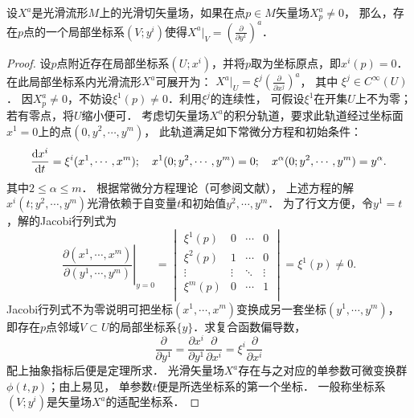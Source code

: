 \begin{theorem}\label{chdm:thm_1PDG-ppy}
    设$X^a$是光滑流形$M$上的光滑切矢量场，如果在点$p \in M$矢量场$X^a_p \neq 0$，
    那么，存在$p$点的一个局部坐标系$(V;y^i)$使得$X^a |_V = (\frac{\partial }{\partial y^1} )^a$．
\end{theorem}
\begin{proof}
    设$p$点附近存在局部坐标系$(U;x^i)$，并将$p$取为坐标原点，即$x^i(p)=0$．
    在此局部坐标系内光滑流形$X^a$可展开为：
    $ X^a |_U = \xi^ j (\frac{\partial }{\partial x^j} )^a$，
    其中 $\xi^ j \in C^\infty(U)$．
    因$X^a_p \neq 0$，不妨设$\xi^1(p)\neq 0$．利用$\xi^j$的连续性，
    可假设$\xi^1$在开集$U$上不为零；若有零点，将$U$缩小便可．
    考虑切矢量场$X^a$的积分轨道，要求此轨道经过坐标面$x^1=0$上的点$(0,y^2,\cdots,y^m)$，
    此轨道满足如下常微分方程和初始条件：
    \begin{equation*}
        \frac{{\rm d} x^i}{{\rm d} t} = \xi^i (x^1,\cdots,x^m); \quad
        x^1(0;y^2,\cdots,y^m) = 0; \quad
        x^\alpha(0;y^2,\cdots,y^m) = y^\alpha.
    \end{equation*}
    其中$2 \leqslant \alpha \leqslant m$．
    根据常微分方程理论（可参阅文献\parencite[\S 31]{arnold-2001-ode}），
    上述方程的解$x^i(t;y^2,\cdots,y^m)$光滑依赖于自变量$t$和初始值$y^2,\cdots,y^m$．
    为了行文方便，令$y^1=t$，解的Jacobi行列式为
    \begin{equation*}
        \left. \frac{\partial (x^1,\cdots,x^m)}{\partial (y^1,\cdots,y^m)} \right|_{y=0}=
        \begin{vmatrix}
            \xi^1(p) & 0 &\cdots & 0 \\
            \xi^2(p) & 1 &\cdots & 0 \\
            \vdots   & \vdots &\ddots & \vdots \\
            \xi^m(p) & 0 &\cdots & 1 \\
        \end{vmatrix}
        = \xi^1(p) \neq 0.
    \end{equation*}
    Jacobi行列式不为零说明可把坐标$(x^1,\cdots,x^m)$变换成另一套坐标$(y^1,\cdots,y^m)$，
    即存在$p$点邻域$V\subset U$的局部坐标系$\{y\}$．求复合函数偏导数，
    \begin{equation*}
        \frac{\partial}{\partial y^1} = \frac{\partial x^i}{\partial y^1} \frac{\partial}{\partial x^i}
        = \xi^i \frac{\partial}{\partial x^i}
    \end{equation*}
    配上抽象指标后便是定理所求．
    光滑矢量场$X^a$存在与之对应的单参数可微变换群$\phi(t,p)$；由上易见，
    单参数$t$便是所选坐标系的第一个坐标．
    一般称坐标系$(V;y^i)$是矢量场$X^a$的{\heiti 适配坐标系}． 
\end{proof}



